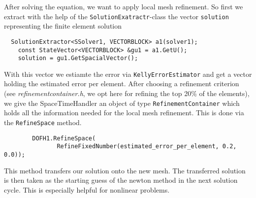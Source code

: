 After solving the equation, we want to apply local mesh refinement. So first we extract with the help of the \texttt{SolutionExatractr}-class the vector \texttt{solution} representing the finite element solution
\begin{verbatim}
  SolutionExtractor<SSolver1, VECTORBLOCK> a1(solver1);
 	const StateVector<VECTORBLOCK> &gu1 = a1.GetU();
 	solution = gu1.GetSpacialVector();
\end{verbatim}
With this vector we estiamte the error via \texttt{KellyErrorEstimator} and get a vector holding the estimated error per element. After choosing a refinement criterion (see \textit{refinementcontainer.h}, we opt here for refining the top 20\% of the elements), we give the SpaceTimeHandler an object of type \texttt{RefinementContainer} which holds all the information needed for the local mesh refinement. This is done via the \texttt{RefineSpace} method.
\begin{verbatim}
        DOFH1.RefineSpace(
               RefineFixedNumber(estimated_error_per_element, 0.2, 0.0));
\end{verbatim}
This method transfers our solution onto the new mesh. The transferred solution is then taken as the starting guess of the newton method in the next solution cycle. This is especially helpful for nonlinear problems.
